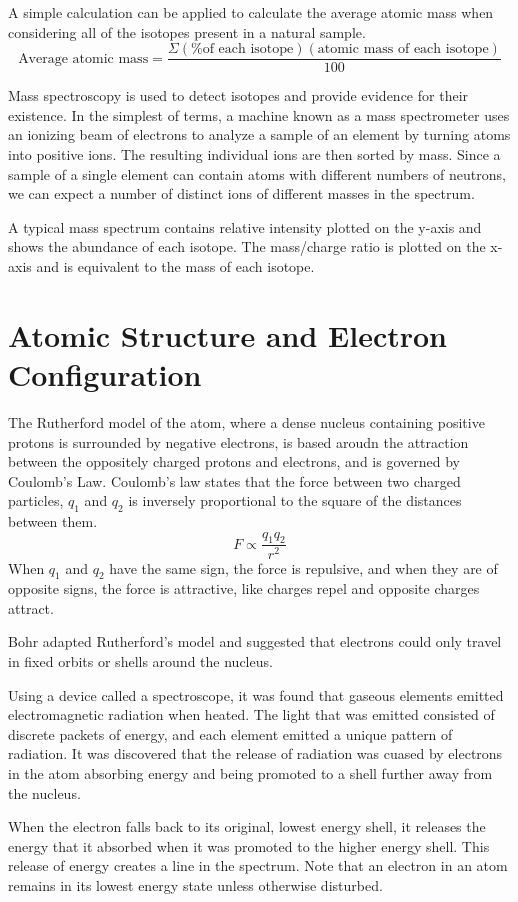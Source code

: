 \documentclass[../chem.tex]{subfiles}
\begin{document}
A simple calculation can be applied to calculate the average atomic mass when considering all of the isotopes present in a natural sample.
\[\text{Average atomic mass}=\frac{\Sigma (\%\text{of each isotope})(\text{atomic mass of each isotope})}{100}\]

Mass spectroscopy is used to detect isotopes and provide evidence for their existence. In the simplest of terms, a machine known as a 
mass spectrometer uses an ionizing beam of electrons to analyze a sample of an element by turning atoms into positive ions. The resulting individual ions 
are then sorted by mass. Since a sample of a single element can contain atoms with different numbers of neutrons, we can expect a number of distinct ions of different masses in the spectrum.

A typical mass spectrum contains relative intensity plotted on the y-axis and shows the abundance of each isotope. The mass/charge ratio 
is plotted on the x-axis and is equivalent to the mass of each isotope.

\section{Atomic Structure and Electron Configuration}
The Rutherford model of the atom, where a dense nucleus containing positive protons is surrounded by negative electrons, is based aroudn the attraction between the oppositely charged protons and electrons, and is governed by Coulomb's Law.
Coulomb's law states that the force between two charged particles, $q_1$ and $q_2$ is inversely proportional to the square of the distances between them.
\[F\propto \frac{q_1q_2}{r^2}\]
When $q_1$ and $q_2$ have the same sign, the force is repulsive, and when they are of opposite signs, the force is attractive, like charges repel and opposite charges attract.

Bohr adapted Rutherford's model and suggested that electrons could only travel in fixed orbits or shells around the nucleus.

Using a device called a spectroscope, it was found that gaseous elements emitted electromagnetic radiation when heated. The light that was emitted consisted of discrete packets of energy,
and each element emitted a unique pattern of radiation. It was discovered that the release of radiation was cuased by electrons in the atom absorbing energy and being promoted
to a shell further away from the nucleus.

When the electron falls back to its original, lowest energy shell, it releases the energy that it absorbed when it was promoted to the higher energy shell.
This release of energy creates a line in the spectrum. Note that an electron in an atom remains in its lowest energy state unless otherwise disturbed.
\end{document}
